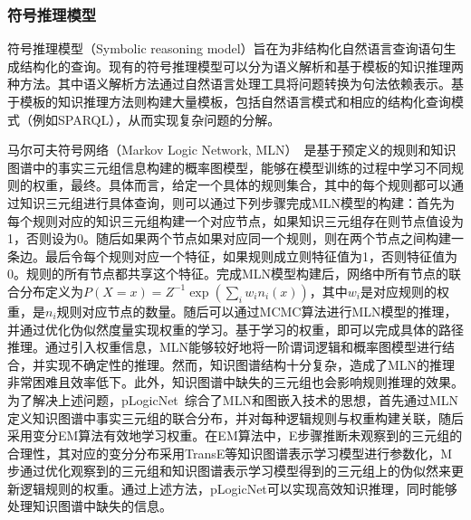 \documentclass[algorithmlist, AutoFakeBold, AutoFakeSlant, figurelist, tablelist, nomlist, engineering, openany]{seuthesix} %
\begin{document}


\subsubsection{符号推理模型}
符号推理模型（Symbolic reasoning model）旨在为非结构化自然语言查询语句生成结构化的查询。现有的符号推理模型可以分为语义解析和基于模板的知识推理两种方法。其中语义解析方法通过自然语言处理工具将问题转换为句法依赖表示。基于模板的知识推理方法则构建大量模板，包括自然语言模式和相应的结构化查询模式（例如SPARQL），从而实现复杂问题的分解。

马尔可夫符号网络（Markov Logic Network, MLN）~\cite{richardson2006markov}是基于预定义的规则和知识图谱中的事实三元组信息构建的概率图模型，能够在模型训练的过程中学习不同规则的权重，最终。具体而言，给定一个具体的规则集合，其中的每个规则都可以通过知识三元组进行具体查询，则可以通过下列步骤完成MLN模型的构建：首先为每个规则对应的知识三元组构建一个对应节点，如果知识三元组存在则节点值设为1，否则设为0。随后如果两个节点如果对应同一个规则，则在两个节点之间构建一条边。最后令每个规则对应一个特征，如果规则成立则特征值为1，否则特征值为0。规则的所有节点都共享这个特征。完成MLN模型构建后，网络中所有节点的联合分布定义为$P(X=x)=Z^{-1} \exp \left(\sum_i w_i n_i(x)\right)$，其中$w_i$是对应规则的权重，是$n_i$规则对应节点的数量。随后可以通过MCMC算法进行MLN模型的推理，并通过优化伪似然度量实现权重的学习。基于学习的权重，即可以完成具体的路径推理。通过引入权重信息，MLN能够较好地将一阶谓词逻辑和概率图模型进行结合，并实现不确定性的推理。然而，知识图谱结构十分复杂，造成了MLN的推理非常困难且效率低下。此外，知识图谱中缺失的三元组也会影响规则推理的效果。为了解决上述问题，pLogicNet~\cite{qu2019probabilistic}综合了MLN和图嵌入技术的思想，首先通过MLN定义知识图谱中事实三元组的联合分布，并对每种逻辑规则与权重构建关联，随后采用变分EM算法有效地学习权重。在EM算法中，E步骤推断未观察到的三元组的合理性，其对应的变分分布采用TransE等知识图谱表示学习模型进行参数化，M步通过优化观察到的三元组和知识图谱表示学习模型得到的三元组上的伪似然来更新逻辑规则的权重。通过上述方法，pLogicNet可以实现高效知识推理，同时能够处理知识图谱中缺失的信息。
\end{document}
